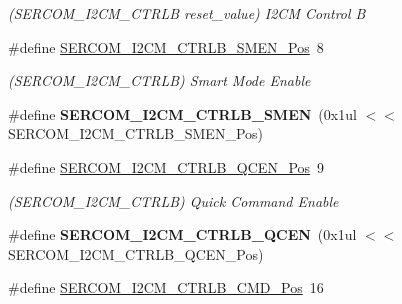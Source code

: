 \begin{DoxyCompactItemize}
\begin{DoxyCompactList}\small\item\em (S\+E\+R\+C\+O\+M\+\_\+\+I2\+C\+M\+\_\+\+C\+T\+R\+L\+B reset\+\_\+value) I2\+C\+M Control B \end{DoxyCompactList}\item 
\hypertarget{group___s_a_m_l21___s_e_r_c_o_m_ga1101ab46d9827c77b5ec0778c764dac0}{}\#define \hyperlink{group___s_a_m_l21___s_e_r_c_o_m_ga1101ab46d9827c77b5ec0778c764dac0}{S\+E\+R\+C\+O\+M\+\_\+\+I2\+C\+M\+\_\+\+C\+T\+R\+L\+B\+\_\+\+S\+M\+E\+N\+\_\+\+Pos}~8\label{group___s_a_m_l21___s_e_r_c_o_m_ga1101ab46d9827c77b5ec0778c764dac0}

\begin{DoxyCompactList}\small\item\em (S\+E\+R\+C\+O\+M\+\_\+\+I2\+C\+M\+\_\+\+C\+T\+R\+L\+B) Smart Mode Enable \end{DoxyCompactList}\item 
\hypertarget{group___s_a_m_l21___s_e_r_c_o_m_gaf92b0c41fbddcdfbb6a78e0c17c95843}{}\#define {\bfseries S\+E\+R\+C\+O\+M\+\_\+\+I2\+C\+M\+\_\+\+C\+T\+R\+L\+B\+\_\+\+S\+M\+E\+N}~(0x1ul $<$$<$ S\+E\+R\+C\+O\+M\+\_\+\+I2\+C\+M\+\_\+\+C\+T\+R\+L\+B\+\_\+\+S\+M\+E\+N\+\_\+\+Pos)\label{group___s_a_m_l21___s_e_r_c_o_m_gaf92b0c41fbddcdfbb6a78e0c17c95843}

\item 
\hypertarget{group___s_a_m_l21___s_e_r_c_o_m_gad75d085418bd1c67613864a56e143e19}{}\#define \hyperlink{group___s_a_m_l21___s_e_r_c_o_m_gad75d085418bd1c67613864a56e143e19}{S\+E\+R\+C\+O\+M\+\_\+\+I2\+C\+M\+\_\+\+C\+T\+R\+L\+B\+\_\+\+Q\+C\+E\+N\+\_\+\+Pos}~9\label{group___s_a_m_l21___s_e_r_c_o_m_gad75d085418bd1c67613864a56e143e19}

\begin{DoxyCompactList}\small\item\em (S\+E\+R\+C\+O\+M\+\_\+\+I2\+C\+M\+\_\+\+C\+T\+R\+L\+B) Quick Command Enable \end{DoxyCompactList}\item 
\hypertarget{group___s_a_m_l21___s_e_r_c_o_m_gaaad66f4ef6072e6be9863169d62c610b}{}\#define {\bfseries S\+E\+R\+C\+O\+M\+\_\+\+I2\+C\+M\+\_\+\+C\+T\+R\+L\+B\+\_\+\+Q\+C\+E\+N}~(0x1ul $<$$<$ S\+E\+R\+C\+O\+M\+\_\+\+I2\+C\+M\+\_\+\+C\+T\+R\+L\+B\+\_\+\+Q\+C\+E\+N\+\_\+\+Pos)\label{group___s_a_m_l21___s_e_r_c_o_m_gaaad66f4ef6072e6be9863169d62c610b}

\item 
\hypertarget{group___s_a_m_l21___s_e_r_c_o_m_gabb90fce400c668fbc6016447c98febf2}{}\#define \hyperlink{group___s_a_m_l21___s_e_r_c_o_m_gabb90fce400c668fbc6016447c98febf2}{S\+E\+R\+C\+O\+M\+\_\+\+I2\+C\+M\+\_\+\+C\+T\+R\+L\+B\+\_\+\+C\+M\+D\+\_\+\+Pos}~16\label{group___s_a_m_l21___s_e_r_c_o_m_gabb90fce400c668fbc6016447c98febf2}


\end{DoxyCompactItemize}
